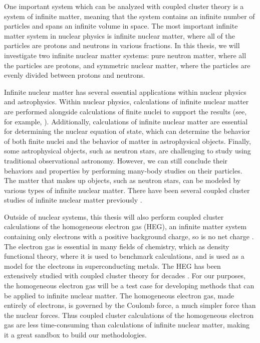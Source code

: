 One important system which can be analyzed with coupled cluster theory is a system of infinite matter, meaning that the system contains an infinite number of particles and spans an infinite volume in space. The most important infinite matter system in nuclear physics is infinite nuclear matter, where all of the particles are protons and neutrons in various fractions. In this thesis, we will investigate two infinite nuclear matter systems: pure neutron matter, where all the particles are protons, and symmetric nuclear matter, where the particles are evenly divided between protons and neutrons.

Infinite nuclear matter has several essential applications within nuclear physics and astrophysics. Within nuclear physics, calculations of infinite nuclear matter are performed alongside calculations of finite nuclei to support the results (see, for example, \cite{Ref20, Ref101, Ref103}). Additionally, calculations of infinite nuclear matter are essential for determining the nuclear equation of state, which can determine the behavior of both finite nuclei and the behavior of matter in astrophysical objects. Finally, some astrophysical objects, such as neutron stars, are challenging to study using traditional observational astronomy. However, we can still conclude their behaviors and properties by performing many-body studies on their particles. The matter that makes up objects, such as neutron stars, can be modeled by various types of infinite nuclear matter\cite{Ref34, Ref35,Ref36,Ref37,Ref38,Ref39,Ref41,Ref55,Ref56,Ref58, Ref84,Ref85}.  There have been several coupled cluster studies of infinite nuclear matter previously \cite{Ref4, Ref9, Ref8, Ref16, Ref93}.

Outside of nuclear systems, this thesis will also perform coupled cluster calculations of the homogeneous electron gas (HEG), an infinite matter system containing only electrons with a positive background charge, so is no net charge \cite{Ref66}. The electron gas is essential in many fields of chemistry, which as density functional theory, where it is used to benchmark calculations, and is used as a model for the electrons in superconducting metals. The HEG has been extensively studied with coupled cluster theory for decades \cite{Ref2, Ref71,Ref72,Ref73,Ref74, Ref95}. For our purposes, the homogeneous electron gas will be a test case for developing methods that can be applied to infinite nuclear matter. The homogeneous electron gas, made entirely of electrons, is governed by the Coulomb force, a much simpler force than the nuclear forces. Thus coupled cluster calculations of the homogeneous electron gas are less time-consuming than calculations of infinite nuclear matter, making it a great sandbox to build our methodologies.

